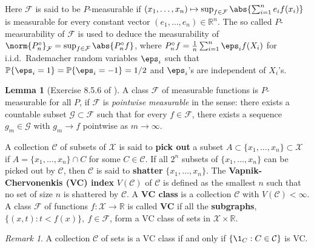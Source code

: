 \documentclass[11pt, a3paper, openany]{article}
\newcommand{\R}{\ensuremath{\mathbb{R}}}
\renewcommand{\P}{\mathbb{P}}
\theoremstyle{remark}
\newcounter{Lem}[section]
\theoremstyle{remark}
\theoremstyle{remark}
\newenvironment{Proof of claim}
  {\begin{proof}[\normalfont \textbf{Proof of claim}]}
  {\end{proof}}
\theoremstyle{definition}
\newtheorem*{Lemma}{Lemma}
\theoremstyle{remark}
\newtheorem*{Rmk}{Remark}
\theoremstyle{plain}
\begin{document}
Here $\mathcal{F}$ is said to be $P$-measurable if $(x_{1},\dots,x_{n}) \mapsto \sup_{f\in\mathcal{F}} \abs{\sum_{i=1}^{n}e_{i}f(x_{i})}$ is measurable for every constant vector $(e_{1},\dots,e_{n}) \in \R^{n}$. 
The so called $P$-measurability of $\mathcal{F}$ is used to deduce the measurability of $\norm{P_{n}^{\circ}}_{\mathcal{F}} = \sup_{f\in\mathcal{F}} \abs{P_{n}^{\circ}f}$, where 
$ P_{n}^{\circ} f = \frac{1}{n} \sum_{i=1}^{n} \eps_{i} f(X_{i}) $
for i.i.d.\ Rademacher random variables $\eps_{i}$ such that $\P\{ \eps_{i} = 1 \} = \P\{ \eps_{i} = -1 \} = 1/2$ and $\eps_{i}$'s are independent of $X_{i}$'s.

\begin{Lemma}[Exercise 8.5.6 of \cite{Kosorok2008Introduction}]
A class $\mathcal{F}$ of measurable functions is $P$-measurable for all $P$, if $\mathcal{F}$ is \emph{pointwise measurable} in the sense: there exists a countable subset $\mathcal{G} \subset \mathcal{F}$ such that for every $f \in \mathcal{F}$, there exists a sequence $g_{m} \in \mathcal{G}$ with $g_{m} \to f$ pointwise as $m \to \infty$.
\end{Lemma}


A collection $\mathcal{C}$ of subsets of $\mathcal{X}$ is said to \textbf{pick out} a subset $A \subset \{x_{1},\dots,x_{n}\} \subset \mathcal{X}$ if $A = \{x_{1},\dots,x_{n}\} \cap C$ for some $C \in \mathcal{C}$. If all $2^{n}$ subsets of $\{x_{1},\dots,x_{n}\}$ can be picked out by $\mathcal{C}$, then $\mathcal{C}$ is said to \textbf{shatter} $\{x_{1},\dots,x_{n}\}$. The \textbf{Vapnik-Chervonenkis (VC) index} $V(\mathcal{C})$ of $\mathcal{C}$ is defined as the smallest $n$ such that no set of size $n$ is shattered by $\mathcal{C}$. A \textbf{VC class} is a collection $\mathcal{C}$ with $V(\mathcal{C}) < \infty$.
A class $\mathcal{F}$ of functions $f : \mathcal{X} \to \R$ is called \textbf{VC} if all the \textbf{subgraphs}, $\{ (x,t) : t<f(x) \}, \ f \in \mathcal{F}$, form a VC class of sets in $\mathcal{X} \times \R$.
\begin{Rmk}
A collection $\mathcal{C}$ of sets is a VC class if and only if $\{\1_{C}:C\in\mathcal{C}\}$ is VC.
\end{Rmk}
\end{document}

